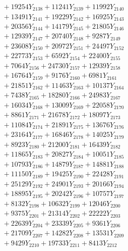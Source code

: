 \documentclass[a4paper,10pt]{article}
\begin{document}
{\begin{align}
&\;  + 19254 Y_{2138} + 11241 Y_{2139} + 11992 Y_{2140} \\[0.3ex]
&\;  + 13491 Y_{2141} + 19229 Y_{2142} + 16925 Y_{2143} \\[0.3ex]
&\;  + 20356 Y_{2144} + 14179 Y_{2145} + 21805 Y_{2146} \\[0.3ex]
&\;  + 12939 Y_{2147} + 20740 Y_{2148} + 9287 Y_{2149} \\[0.3ex]
&\;  + 23608 Y_{2150} + 20972 Y_{2151} + 24497 Y_{2152} \\[0.3ex]
&\;  + 22773 Y_{2153} + 6592 Y_{2154} + 22400 Y_{2155} \\[0.3ex]
&\;  + 7064 Y_{2156} + 24730 Y_{2157} + 12939 Y_{2158} \\[0.5ex]\allowbreak
&\;  + 16764 Y_{2159} + 9176 Y_{2160} + 6981 Y_{2161} \\[0.3ex]
&\;  + 21851 Y_{2162} + 11463 Y_{2163} + 10137 Y_{2164} \\[0.3ex]
&\;  + 7438 Y_{2165} + 18280 Y_{2166} + 24983 Y_{2167} \\[0.3ex]
&\;  + 16034 Y_{2168} + 13009 Y_{2169} + 22058 Y_{2170} \\[0.3ex]
&\;  + 8861 Y_{2171} + 21678 Y_{2172} + 18097 Y_{2173} \\[0.3ex]
&\;  + 11084 Y_{2174} + 21891 Y_{2175} + 13676 Y_{2176} \\[0.3ex]
&\;  + 23164 Y_{2177} + 16846 Y_{2178} + 14025 Y_{2179} \\[0.3ex]
&\;  + 8923 Y_{2180} + 21200 Y_{2181} + 16439 Y_{2182} \\[0.3ex]
&\;  + 11865 Y_{2183} + 20827 Y_{2184} + 10051 Y_{2185} \\[0.3ex]
&\;  + 10793 Y_{2186} + 14879 Y_{2187} + 14881 Y_{2188} \\[0.5ex]\allowbreak
&\;  + 11150 Y_{2189} + 19425 Y_{2190} + 22428 Y_{2191} \\[0.3ex]
&\;  + 25129 Y_{2192} + 24901 Y_{2193} + 20166 Y_{2194} \\[0.3ex]
&\;  + 18895 Y_{2195} + 20242 Y_{2196} + 10757 Y_{2197} \\[0.3ex]
&\;  + 8132 Y_{2198} + 10632 Y_{2199} + 12046 Y_{2200} \\[0.3ex]
&\;  + 9375 Y_{2201} + 21314 Y_{2202} + 22222 Y_{2203} \\[0.3ex]
&\;  + 22639 Y_{2204} + 23339 Y_{2205} + 9361 Y_{2206} \\[0.3ex]
&\;  + 21709 Y_{2207} + 14282 Y_{2208} + 13531 Y_{2209} \\[0.3ex]
&\;  + 9429 Y_{2210} + 19733 Y_{2211} + 8413 Y_{2212} \\[0.3ex]

\end{align}}
\end{document}
